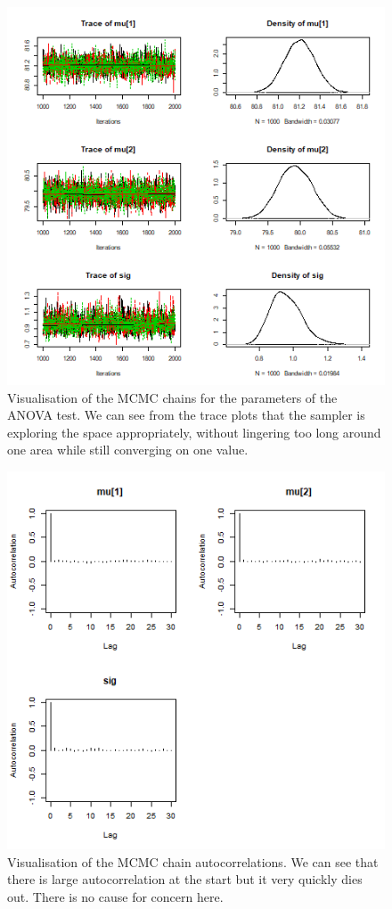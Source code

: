 \documentclass[journal, a4paper]{IEEEtran}
\begin{document}
\begin{figure}[h!]
	\includegraphics{../plots/04_chains_ANOVA.png}
	\caption{Visualisation of the MCMC chains for the parameters of the ANOVA test. We can see from the trace plots that the sampler is exploring the space
	appropriately, without lingering too long around one area while still converging on one value.}
	\label{fig:4}
\end{figure}

\begin{figure}[h!]
	\includegraphics{../plots/05_autocorr.png}
	\caption{Visualisation of the MCMC chain autocorrelations. We can see that there is large autocorrelation at the start but it very quickly dies out. There
	is no cause for concern here.}
	\label{fig:5}
\end{figure}
\end{document}
